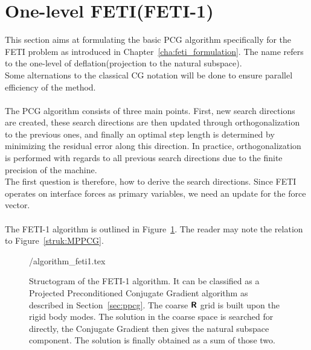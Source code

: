 \section{One-level FETI(FETI-1)}\label{sec:feti1}
This section aims at formulating the basic PCG algorithm specifically for the FETI problem as introduced in Chapter~\ref{cha:feti_formulation}. The name refers to the one-level of deflation(projection to the natural subspace).\\
Some alternations to the classical CG notation will be done to ensure parallel efficiency of the method.\\
\\
The PCG algorithm consists of three main points. First, new search directions are created, these search directions are then updated through orthogonalization to the previous ones, and finally an optimal step length is determined by minimizing the residual error along this direction. In practice, orthogonalization is performed with regards to all previous search directions due to the finite precision of the machine.
\\
The first question is therefore, how to derive the search directions. Since FETI operates on interface forces as primary variables, we need an update for the force vector.\\
\\
The FETI-1 algorithm is outlined in Figure~\ref{strukt:feti1}. The reader may note the relation to Figure~\ref{struk:MPPCG}.
\\
\begin{figure}[ht]
  \centering
  {\tikzpath/algorithm_feti1.tex}
  \caption[Structogram FETI-1 algorithm]{Structogram of the FETI-1 algorithm. It can be classified as a Projected Preconditioned Conjugate Gradient algorithm as described in Section~\ref{sec:ppcg}. The coarse $\boldsymbol{\mathsf{R}}$ grid is built upon the rigid body modes. The solution in the coarse space is searched for directly, the Conjugate Gradient then gives the natural subspace component. The solution is finally obtained as a sum of those two.}
  \label{strukt:feti1}
\end{figure}

